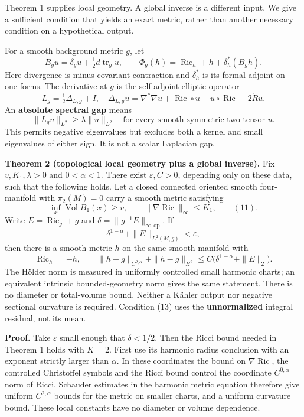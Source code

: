 \documentclass[
  11pt,
]{article}
\begin{document}
Theorem 1 supplies local geometry. A global inverse is a different
input. We give a sufficient condition that yields an exact metric,
rather than another necessary condition on a hypothetical output.

For a smooth background metric \(g\), let \[
 B_gu=\delta_gu+\tfrac12d\operatorname{tr}_gu,
 \qquad
 \Phi_g(h)=\operatorname{Ric}_h+h+\delta_h^*(B_gh).               \tag{9}
\] Here divergence is minus covariant contraction and \(\delta_h^*\) is
its formal adjoint on one-forms. The derivative at \(g\) is the
self-adjoint elliptic operator \[
 L_g=\tfrac12\Delta_{L,g}+I,
 \quad
 \Delta_{L,g}u=\nabla^*\nabla u+\operatorname{Ric}\circ u
             +u\circ\operatorname{Ric}-2\mathring R u.          \tag{10}
\] An \textbf{absolute spectral gap} means \[
 \|L_gu\|_{L^2}\ge\lambda\|u\|_{L^2}
       \quad\text{for every smooth symmetric two-tensor }u.     \tag{11}
\] This permits negative eigenvalues but excludes both a kernel and
small eigenvalues of either sign. It is not a scalar Laplacian gap.

\textbf{Theorem 2 (topological local geometry plus a global inverse).}
Fix \(v,K_1,\lambda>0\) and \(0<\alpha<1\). There exist
\(\varepsilon,C>0\), depending only on these data, such that the
following holds. Let a closed connected oriented smooth four-manifold
with \(\pi_2(M)=0\) carry a smooth metric satisfying \[
 \inf_x\operatorname{Vol}B_1(x)\ge v,\qquad
 \|\nabla\operatorname{Ric}\|_\infty\le K_1,
 \qquad (11).                                                \tag{12}
\] Write \(E=\operatorname{Ric}_g+g\) and
\(\delta=\|g^{-1}E\|_{\infty,\mathrm{op}}\). If \[
 \delta^{1-\alpha}+\|E\|_{L^2(M,g)}<\varepsilon,                \tag{13}
\] then there is a smooth metric \(h\) on the same smooth manifold with
\[
 \operatorname{Ric}_h=-h,\qquad
 \|h-g\|_{C^{2,\alpha}}+\|h-g\|_{H^2}
       \le C\bigl(\delta^{1-\alpha}+\|E\|_2\bigr).             \tag{14}
\] The Hölder norm is measured in uniformly controlled small harmonic
charts; an equivalent intrinsic bounded-geometry norm gives the same
statement. There is no diameter or total-volume bound. Neither a Kähler
output nor negative sectional curvature is required. Condition (13) uses
the \textbf{unnormalized} integral residual, not its mean.

\textbf{Proof.} Take \(\varepsilon\) small enough that \(\delta<1/2\).
Then the Ricci bound needed in Theorem 1 holds with \(K=2\). First use
its harmonic radius conclusion with an exponent strictly larger than
\(\alpha\). In these coordinates the bound on
\(\nabla\operatorname{Ric}\), the controlled Christoffel symbols and the
Ricci bound control the coordinate \(C^{0,\alpha}\) norm of Ricci.
Schauder estimates in the harmonic metric equation therefore give
uniform \(C^{2,\alpha}\) bounds for the metric on smaller charts, and a
uniform curvature bound. These local constants have no diameter or
volume dependence.
\end{document}
